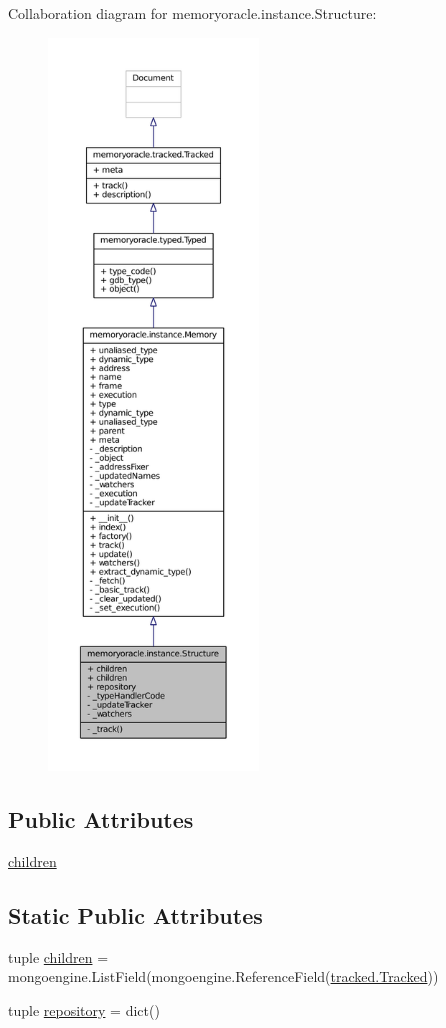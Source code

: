 Collaboration diagram for memoryoracle.\+instance.\+Structure\+:
\nopagebreak
\begin{figure}[H]
\begin{center}
\leavevmode
\includegraphics[height=550pt]{classmemoryoracle_1_1instance_1_1Structure__coll__graph}
\end{center}
\end{figure}
\subsection*{Public Attributes}
\begin{DoxyCompactItemize}
\item 
\hyperlink{classmemoryoracle_1_1instance_1_1Structure_ac9da48acb0aae1763cc98f5b3ab8fee3}{children}
\end{DoxyCompactItemize}
\subsection*{Static Public Attributes}
\begin{DoxyCompactItemize}
\item 
tuple \hyperlink{classmemoryoracle_1_1instance_1_1Structure_a5a8dcad9bb85bbde2676e9b6e9fa138e}{children} = mongoengine.\+List\+Field(mongoengine.\+Reference\+Field(\hyperlink{classmemoryoracle_1_1tracked_1_1Tracked}{tracked.\+Tracked}))
\item 
tuple \hyperlink{classmemoryoracle_1_1instance_1_1Structure_a1c9e520113c49be36a1bc9f57b6deee4}{repository} = dict()
\end{DoxyCompactItemize}
